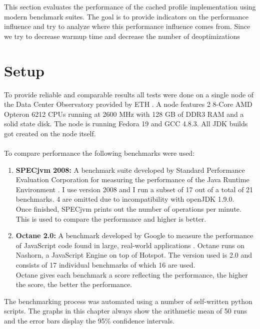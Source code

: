 This section evaluates the performance of the cached profile implementation using modern benchmark suites. The goal is to provide indicators on the performance influence and try to analyze where this performance influence comes from. Since we try to decrease warmup time and decrease the number of deoptimizations 
\section{Setup}
\label{s:perf_setup}
To provide reliable and comparable results all tests were done on a single node of the Data Center Observatory provided by ETH \cite{ethdco}.
A node features 2 8-Core AMD Opteron 6212 CPUs running at 2600 MHz with 128 GB of DDR3 RAM and a solid state disk.
The node is running Fedora 19 and GCC 4.8.3. All JDK builds got created on the node itself.
\\\\
To compare performance the following benchmarks were used:
\begin{enumerate}
  \item \textbf{SPECjvm 2008:} A benchmark suite developed by Standard Performance Evaluation Corporation for measuring the performance of the Java Runtime Environment \cite{specjvm}.  I use version 2008 and I run a subset of 17 out of a total of 21 benchmarks. 4 are omitted due to incompatibility with openJDK 1.9.0.
  \\
  Once finished, SPECjvm prints out the number of operations per minute. This is used to compare the performance and higher is better.
  \item \textbf{Octane 2.0:} A benchmark developed by Google to measure the performance of JavaScript code found in large, real-world applications \cite{octane}. Octane runs on Nashorn, a JavaScript Engine on top of Hotspot. The version used is 2.0 and consists of 17 individual benchmarks of which 16 are used.
  \\
  Octane gives each benchmark a score reflecting the performance, the higher the score, the better the performance.
\end{enumerate}
The benchmarking process was automated using a number of self-written python scripts. The graphs in this chapter always show the arithmetic mean of 50 runs and the error bars display the 95\% confidence intervals.

